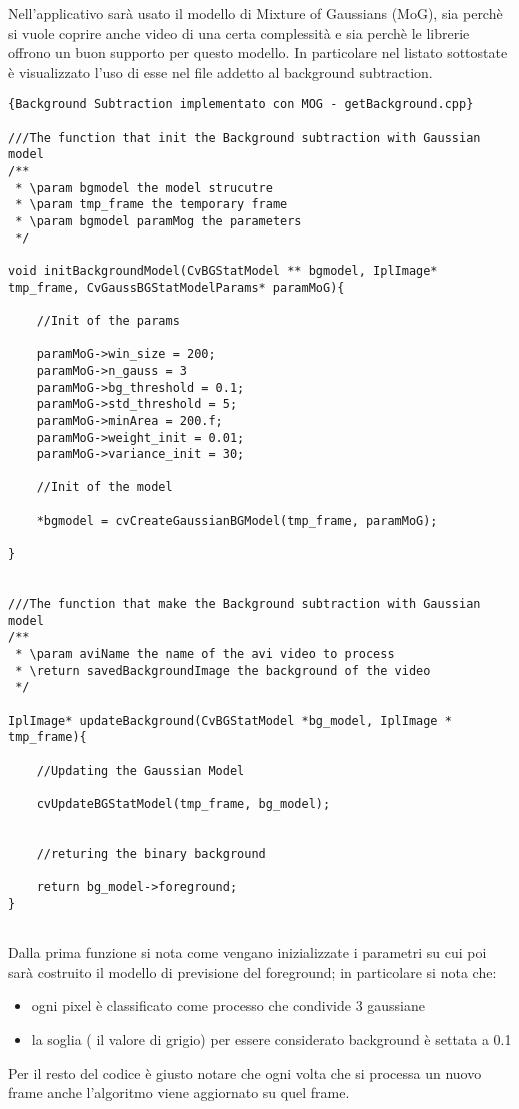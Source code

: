 Nell'applicativo sarà usato il modello di Mixture of Gaussians (MoG), sia perchè si vuole coprire anche video di una certa complessità e sia perchè le librerie offrono un buon supporto per questo modello. In particolare nel listato sottostate è visualizzato l'uso di esse nel file addetto al background subtraction.

\lstset{language=c++}
\lstset{commentstyle=\emph}
\begin{lstlisting}[frame=r,caption=Background Subtraction implementato con MOG - getBackground.cpp ,breaklines=true,basicstyle=\small]{Background Subtraction implementato con MOG - getBackground.cpp}

///The function that init the Background subtraction with Gaussian model
/**
 * \param bgmodel the model strucutre
 * \param tmp_frame the temporary frame
 * \param bgmodel paramMog the parameters
 */

void initBackgroundModel(CvBGStatModel ** bgmodel, IplImage* tmp_frame, CvGaussBGStatModelParams* paramMoG){
	
	//Init of the params

	paramMoG->win_size = 200; 
	paramMoG->n_gauss = 3
	paramMoG->bg_threshold = 0.1;
	paramMoG->std_threshold = 5;
	paramMoG->minArea = 200.f;
	paramMoG->weight_init = 0.01;
	paramMoG->variance_init = 30; 
	
	//Init of the model

	*bgmodel = cvCreateGaussianBGModel(tmp_frame, paramMoG);
	
}


///The function that make the Background subtraction with Gaussian model
/**
 * \param aviName the name of the avi video to process
 * \return savedBackgroundImage the background of the video
 */

IplImage* updateBackground(CvBGStatModel *bg_model, IplImage * tmp_frame){
	 
	//Updating the Gaussian Model

	cvUpdateBGStatModel(tmp_frame, bg_model);
  
	
	//returing the binary background

	return bg_model->foreground;
}


\end{lstlisting}

Dalla prima funzione si nota come vengano inizializzate i parametri su cui poi sarà costruito il modello di previsione del foreground; in particolare si nota che:

\begin{itemize}
\item ogni pixel è classificato come processo che condivide 3 gaussiane 
\item la soglia ( il valore di grigio) per essere considerato background è settata a 0.1 
\end{itemize}
Per il resto del codice è giusto notare che ogni volta che si processa un nuovo frame anche l'algoritmo viene aggiornato su quel frame.

